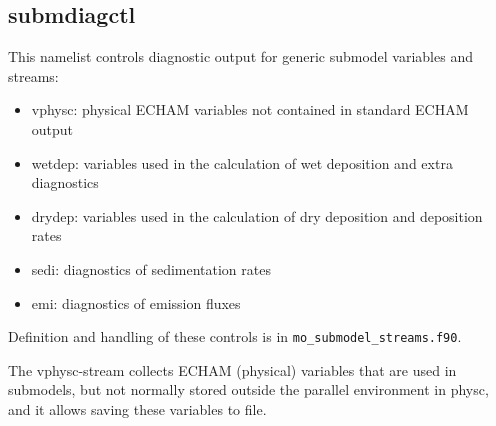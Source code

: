 \documentclass[landscape, 11pt]{article}
\begin{document}
\subsection{submdiagctl} 
This namelist controls diagnostic output for generic submodel variables and streams:
\begin{itemize}
  \item vphysc: physical ECHAM variables not contained in standard ECHAM output
  \item wetdep: variables used in the calculation of wet deposition and extra diagnostics
  \item drydep: variables used in the calculation of dry deposition and deposition rates
  \item sedi: diagnostics of sedimentation rates
  \item emi: diagnostics of emission fluxes
\end{itemize}
Definition and handling of these controls is in \texttt{mo\_submodel\_streams.f90}.

The vphysc-stream collects ECHAM (physical) variables that are used in submodels, but not normally stored outside the parallel environment in physc, and it allows saving these variables to file.\\
\end{document}
